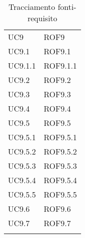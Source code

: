 \begin{longtable}{p{2.5cm}!{\VRule[1pt]}p{2.5cm}}
	UC9 & ROF9\\
	UC9.1 & ROF9.1\\
	UC9.1.1 & ROF9.1.1\\
	UC9.2 & ROF9.2\\
	UC9.3 & ROF9.3\\
	UC9.4 & ROF9.4\\
	UC9.5 & ROF9.5\\
	UC9.5.1 & ROF9.5.1\\
	UC9.5.2 & ROF9.5.2\\
	UC9.5.3 & ROF9.5.3\\
	UC9.5.4 & ROF9.5.4\\
	UC9.5.5 & ROF9.5.5\\
	UC9.6 & ROF9.6\\
	UC9.7 & ROF9.7\\
	\caption{Tracciamento fonti-requisito}
\end{longtable}